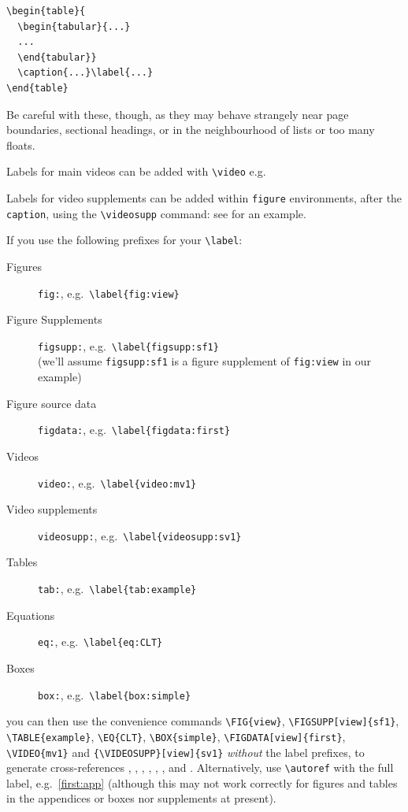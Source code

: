 \documentclass[9pt,lineno]{crone}
\begin{document}
\begin{verbatim}
\begin{table}{
  \begin{tabular}{...}
  ...
  \end{tabular}}
  \caption{...}\label{...}
\end{table}
\end{verbatim}

Be careful with these, though, as they may behave strangely near page boundaries, sectional headings, or in the neighbourhood of lists or too many floats.

Labels for main videos can be added with \verb|\video| e.g.

\label{video:mv1}

Labels for video supplements can be added within \texttt{figure} environments, after the \texttt{caption}, using the \verb|\videosupp| command: see  for an example.

If you use the following prefixes for your \verb|\label|:
%
\begin{description}
\item[Figures] \texttt{fig:}, e.g.~\verb|\label{fig:view}|
\item[Figure Supplements] \texttt{figsupp:}, e.g.~\verb|\label{figsupp:sf1}|\\
(we'll assume \texttt{figsupp:sf1} is a figure supplement of \texttt{fig:view} in our example)
\item[Figure source data] \texttt{figdata:}, e.g.~\verb|\label{figdata:first}|
\item[Videos] \texttt{video:}, e.g.~\verb|\label{video:mv1}|
\item[Video supplements] \texttt{videosupp:}, e.g.~\verb|\label{videosupp:sv1}|
\item[Tables] \texttt{tab:}, e.g.~\verb|\label{tab:example}|
\item[Equations] \texttt{eq:}, e.g.~\verb|\label{eq:CLT}|
\item[Boxes] \texttt{box:}, e.g.~\verb|\label{box:simple}|
\end{description}
%
you can then use the convenience commands \verb|\FIG{view}|, \verb|\FIGSUPP[view]{sf1}|, \verb|\TABLE{example}|, \verb|\EQ{CLT}|, \verb|\BOX{simple}|, \verb|\FIGDATA[view]{first}|, \verb|\VIDEO{mv1}| and \verb|{\VIDEOSUPP}[view]{sv1}| \emph{without} the label prefixes, to generate cross-references , ,  , , , ,  and . Alternatively, use \verb|\autoref| with the full label, e.g.~\autoref{first:app} (although this may not work correctly for figures and tables in the appendices or boxes nor supplements at present).
\end{document}
